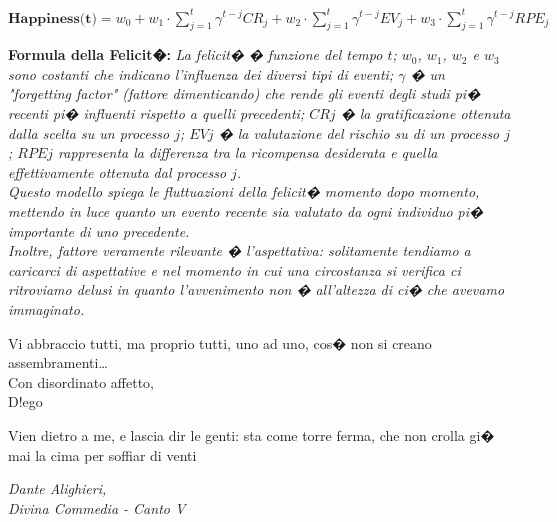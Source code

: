 \documentclass[10pt]{article}
\begin{document}
	{\em $\textbf{Happiness(t)}=w_{0}+w_{1} \cdot\displaystyle{\sum_{j=1}^{t}} \gamma^{t-j} C R_{j}+w_{2} \cdot\sum_{j=1}^{t} \gamma^{t-j} E V_{j}+w_{3} \cdot\sum_{j=1}^{t} \gamma^{t-j} R P E_{j}$}
	
	\begin{quoting}{\textbf{\small Formula della Felicit�:} {\em La felicit� � funzione del tempo $t$; $w_0$, $w_1$, $w_2$ e $w_3$ sono costanti che indicano l'influenza dei diversi tipi di eventi; $\gamma$ � un "forgetting factor" (fattore dimenticando) che rende gli eventi degli studi pi� recenti pi� influenti rispetto a quelli precedenti; $CRj$ � la gratificazione ottenuta dalla scelta su un processo $j$; $EVj$ � la valutazione del rischio su di un processo $j$; $RPEj$ rappresenta la differenza tra la ricompensa desiderata e quella effettivamente ottenuta dal processo $j$.\\
Questo modello spiega le fluttuazioni della felicit� momento dopo momento, mettendo in luce quanto un evento recente sia valutato da ogni individuo pi� importante di uno precedente.\\
Inoltre, fattore veramente rilevante � l'aspettativa: solitamente tendiamo a caricarci di aspettative e nel momento in cui una circostanza si verifica ci ritroviamo delusi in quanto l'avvenimento non � all'altezza di ci� che avevamo immaginato.}}
\end{quoting}

Vi abbraccio tutti, ma proprio tutti, uno ad uno, cos� non si creano assembramenti\dots\\

Con disordinato affetto,\\

D!ego

\epigraph{Vien dietro a me, e lascia dir le genti:
sta come torre ferma, che non crolla
gi� mai la cima per soffiar di venti}{\textit {Dante Alighieri, \\ Divina Commedia - Canto V}}
\end{document}
